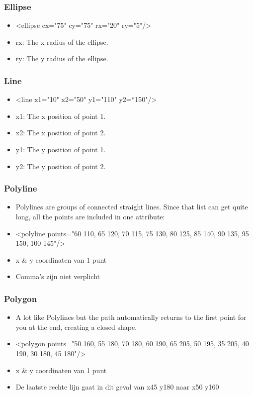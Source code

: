 \documentclass{article}
\begin{document}
\subsubsection{Ellipse}
\begin{itemize}
    \item <ellipse cx="75" cy="75" rx="20" ry="5"/>
    \item rx: The x radius of the ellipse.
    \item ry: The y radius of the ellipse.
\end{itemize}

\subsubsection{Line}
\begin{itemize}
    \item <line x1="10" x2="50" y1="110" y2=“150"/>
    \item x1: The x position of point 1.
    \item x2: The x position of point 2.
    \item y1: The y position of point 1.
    \item y2: The y position of point 2.
\end{itemize}

\subsubsection{Polyline}
\begin{itemize}
    \item Polylines are groups of connected straight lines. Since that list can get quite long, all the points are included in one attribute:
    \item <polyline points="60 110, 65 120, 70 115, 75 130, 80 125, 85 140, 90 135, 95 150, 100 145"/>
    \item x \& y coordinaten van 1 punt
    \item Comma’s zijn niet verplicht
\end{itemize}

\subsubsection{Polygon}
\begin{itemize}
    \item A lot like Polylines but the path automatically returns to the first point for you at the end, creating a closed shape.
    \item <polygon points="50 160, 55 180, 70 180, 60 190, 65 205, 50 195, 35 205, 40 190, 30 180, 45 180"/>
    \item x \& y coordinaten van 1 punt
    \item De laatste rechte lijn gaat in dit geval van x45 y180 naar x50 y160
\end{itemize}
\end{document}
